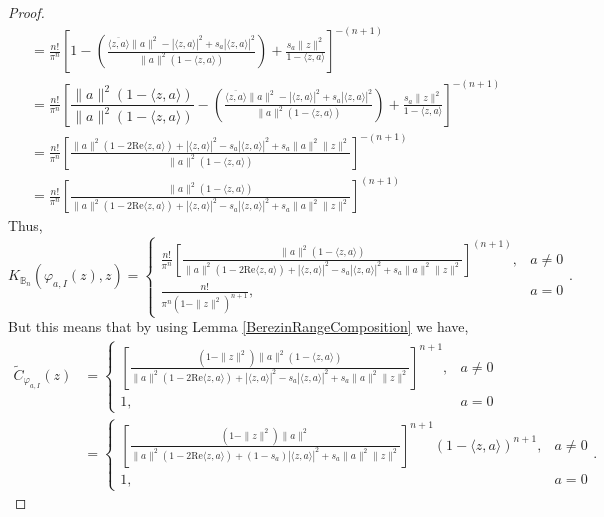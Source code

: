 \documentclass{amsart}
\theoremstyle{remark}
\newcommand{\B}{\mathbb{B}}
\begin{document}
\begin{proof}
\begin{align*}
                                  &= \frac{n!}{\pi^{n}}\left[1-\left(\frac{\overline{\langle z,a \rangle}\|a\|^{2} - |\langle z,a \rangle|^2 + s_{a}|\langle z,a \rangle|^2}{\|a\|^{2}(1 - \langle z,a \rangle)}\right) + \frac{s_{a}\|z\|^2}{1 - \langle z,a \rangle}\right]^{-(n+1)} \\
                                  &= \frac{n!}{\pi^{n}}\left[\dfrac{\|a\|^{2}(1 - \langle z,a \rangle)}{\|a\|^{2}(1 - \langle z,a \rangle)}-\left(\frac{\overline{\langle z,a \rangle}\|a\|^{2} - |\langle z,a \rangle|^2 + s_{a}|\langle z,a \rangle|^2}{\|a\|^{2}(1 - \langle z,a \rangle)}\right) + \frac{s_{a}\|z\|^2}{1 - \langle z,a \rangle}\right]^{-(n+1)} \\
                                  &= \frac{n!}{\pi^{n}}\left[\frac{\|a\|^{2}(1-2\mathrm{Re}\langle z,a \rangle) + |\langle z,a \rangle|^2 - s_{a}|\langle z,a \rangle|^2 + s_{a}\|a\|^2\|z\|^2}{\|a\|^{2}(1 - \langle z,a \rangle)}\right]^{-(n+1)} \\
                                  &= \frac{n!}{\pi^{n}}\left[\frac{\|a\|^{2}(1 - \langle z,a \rangle)}{\|a\|^{2}(1-2\mathrm{Re}\langle z,a \rangle) + |\langle z,a \rangle|^2 - s_{a}|\langle z,a \rangle|^2 + s_{a}\|a\|^2\|z\|^2}\right]^{(n+1)}
    \end{align*}
    Thus,
    \begin{equation*}
        K_{\B_{n}}(\varphi_{a,I}(z),z) = 
        \begin{cases}
            \frac{n!}{\pi^{n}}\left[\frac{\|a\|^{2}(1 - \langle z,a \rangle)}{\|a\|^{2}(1-2\mathrm{Re}\langle z,a \rangle) + |\langle z,a \rangle|^2 - s_{a}|\langle z,a \rangle|^2 + s_{a}\|a\|^2\|z\|^2}\right]^{(n+1)}, & a \neq 0 \\
            \frac{n!}{\pi^{n}(1-\|z\|^{2})^{n+1}}, & a = 0
        \end{cases}
        .
    \end{equation*}
    But this means that by using Lemma \ref{BerezinRangeComposition} we have,
        \begin{align*}
        \widetilde{C}_{\varphi_{a,I}}(z) &= 
        \begin{cases}
            \left[\frac{(1 - \|z\|^{2})\|a\|^{2}(1 - \langle z,a \rangle)}{\|a\|^{2}(1-2\mathrm{Re}\langle z,a \rangle) + |\langle z,a \rangle|^2 - s_{a}|\langle z,a \rangle|^2 + s_{a}\|a\|^2\|z\|^2}\right]^{n+1}, & a \neq 0 \\
            1, & a = 0
        \end{cases} \\
        &= 
        \begin{cases}
            \left[\frac{(1 - \|z\|^{2})\|a\|^{2}}{\|a\|^{2}(1-2\mathrm{Re}\langle z,a \rangle) + (1-s_{a})|\langle z,a \rangle|^2 + s_{a}\|a\|^2\|z\|^2}\right]^{n+1}(1 - \langle z,a \rangle)^{n+1}, & a \neq 0 \\
            1 ,& a = 0
        \end{cases}
        .
    \end{align*}
\end{proof}
\end{document}
